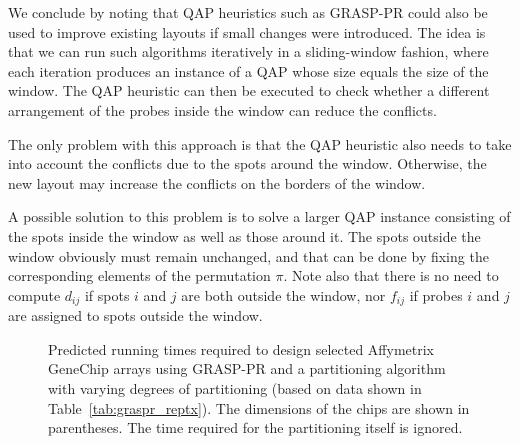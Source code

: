 \documentclass{bioinfo}
\begin{document}
We conclude by noting that QAP heuristics such as GRASP-PR could also be used to improve existing layouts if small changes were introduced. The idea is that we can run such algorithms iteratively in a sliding-window fashion, where each iteration produces an instance of a QAP whose size equals the size of the window. The QAP heuristic can then be executed to check whether a different arrangement of the probes inside the window can reduce the conflicts.

The only problem with this approach is that the QAP heuristic also needs to take into account the conflicts due to the spots around the window. Otherwise, the new layout may increase the conflicts on the borders of the window.

A possible solution to this problem is to solve a larger QAP instance consisting of the spots inside the window as well as those around it. The spots outside the window obviously must remain unchanged, and that can be done by fixing the corresponding elements of the permutation $\pi$. Note also that there is no need to compute $d_{ij}$ if spots $i$ and $j$ are both outside the window, nor $f_{ij}$ if probes $i$ and $j$ are assigned to spots outside the window.

\begin{figure}
{\footnotesize \centerline{}}
\caption{Predicted running times required to design selected Affymetrix GeneChip arrays using GRASP-PR and a partitioning algorithm with varying degrees of partitioning (based on data shown in Table~\ref{tab:graspr_reptx}). The dimensions of the chips are shown in parentheses. The time required for the partitioning itself is ignored.}\label{fig:time_extrapolation}
\end{figure}
\end{document}
